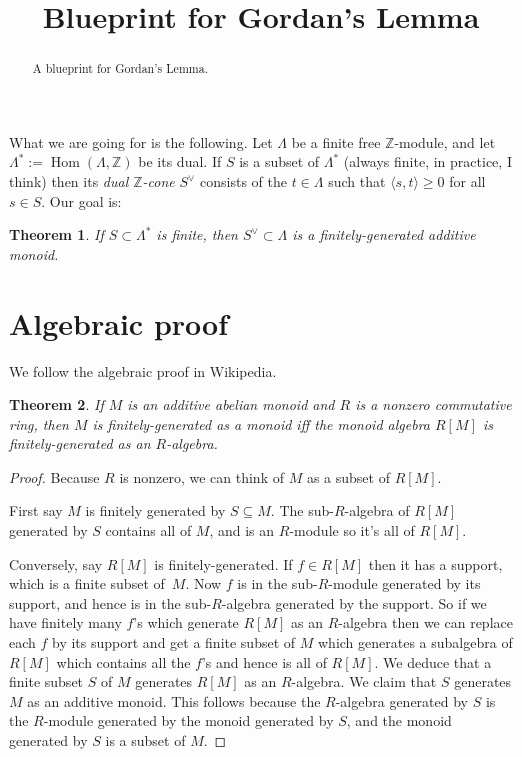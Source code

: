 \documentclass[english]{amsart}
\newcommand{\Z}{\mathbb{Z}}
\DeclareMathOperator{\Hom}{Hom}
\newtheorem{theorem}{Theorem}
\begin{document}
\title[]{Blueprint for Gordan's Lemma}

\begin{abstract}
A blueprint for Gordan's Lemma.
\end{abstract}

\maketitle

What we are going for is the following. Let $\Lambda$ be a finite free $\Z$-module, and let $\Lambda^*:=\Hom(\Lambda,\Z)$ be its dual. If $S$ is a subset of $\Lambda^*$ (always finite, in practice, I think) then its \emph{dual $\Z$-cone} $S^\vee$ consists of the $t\in\Lambda$ such that $\langle s,t\rangle\geq0$ for all $s\in S$. Our goal is:

\begin{theorem}
If $S \subset \Lambda^*$ is finite, then $S^\vee \subset \Lambda$ is a finitely-generated additive monoid.
\end{theorem}

\section{Algebraic proof}

We follow the algebraic proof in Wikipedia.

\begin{theorem} \label{t:RMfg}
If $M$ is an additive abelian monoid and $R$ is a nonzero commutative ring, then $M$ is finitely-generated as a monoid iff the monoid algebra $R[M]$ is finitely-generated as an $R$-algebra.
\end{theorem}
\begin{proof} Because $R$ is nonzero, we can think of $M$ as a subset of $R[M]$.

  First say $M$ is finitely generated by $S\subseteq M$. The sub-$R$-algebra of $R[M]$ generated by $S$ contains all of $M$, and is an $R$-module so it's all of $R[M]$.

  Conversely, say $R[M]$ is finitely-generated. If $f\in R[M]$ then it has a support, which is a finite subset of~$M$. Now $f$ is in the sub-$R$-module generated by its support, and hence is in the sub-$R$-algebra generated by the support. So if we have finitely many $f$'s which generate $R[M]$ as an $R$-algebra then we can replace each $f$ by its support and get a finite subset of $M$ which generates a subalgebra of $R[M]$ which contains all the $f$'s and hence is all of $R[M]$. We deduce that a finite subset $S$ of $M$ generates $R[M]$ as an $R$-algebra. We claim that $S$ generates $M$ as an additive monoid. This follows because the $R$-algebra generated by $S$ is the $R$-module generated by the monoid generated by $S$, and the monoid generated by $S$ is a subset of $M$.
\end{proof}
\end{document}
